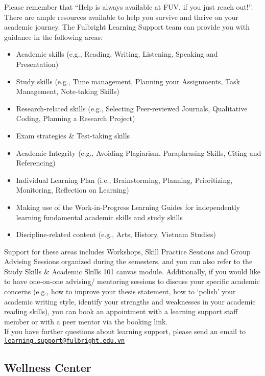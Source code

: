\documentclass[
]{article}
\providecommand{\tightlist}{%
  \setlength{\itemsep}{0pt}\setlength{\parskip}{0pt}}
\begin{document}
Please remember that ``Help is always available at FUV, if you just reach out!''. There are ample resources available to help you survive and thrive on your academic journey. The Fulbright Learning Support team can provide you with guidance in the following areas:

\begin{itemize}
\tightlist
\item
  Academic skills (e.g., Reading, Writing, Listening, Speaking and Presentation)
\item
  Study skills (e.g., Time management, Planning your Assignments, Task Management, Note-taking Skills)\\
\item
  Research-related skills (e.g., Selecting Peer-reviewed Journals, Qualitative Coding, Planning a Research Project)
\item
  Exam strategies \& Test-taking skills\\
\item
  Academic Integrity (e.g., Avoiding Plagiarism, Paraphrasing Skills, Citing and Referencing)
\item
  Individual Learning Plan (i.e., Brainstorming, Planning, Prioritizing, Monitoring, Reflection on Learning)
\item
  Making use of the Work-in-Progress Learning Guides for independently learning fundamental academic skills and study skills
\item
  Discipline-related content (e.g., Arts, History, Vietnam Studies)
\end{itemize}

Support for these areas includes Workshops, Skill Practice Sessions and Group Advising Sessions organized during the semesters, and you can also refer to the Study Skills \& Academic Skills 101 canvas module. Additionally, if you would like to have one-on-one advising/ mentoring sessions to discuss your specific academic concerns (e.g., how to improve your thesis statement, how to `polish' your academic writing style, identify your strengths and weaknesses in your academic reading skills), you can book an appointment with a learning support staff member or with a peer mentor via the booking link.\\
If you have further questions about learning support, please send an email to \href{mailto:learning.support@fulbright.edu.vn}{\nolinkurl{learning.support@fulbright.edu.vn}}

\hypertarget{wellness-center}{%
\subsection*{Wellness Center}\label{wellness-center}}
\end{document}
